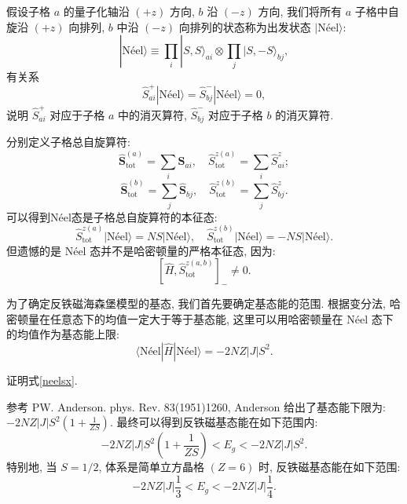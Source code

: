 假设子格 $a$ 的量子化轴沿 $(+z)$ 方向, $b$ 沿 $(-z)$ 方向, 我们将所有 $a$ 子格中自旋沿 $(+z)$ 向排列, $b$ 中沿 $(-z)$ 向排列的状态称为出发状态 $|\text{Néel}\rangle$:
\begin{equation}
|\text{Néel}\rangle\equiv\prod_{i}|S, S\rangle_{a i} \otimes \prod_{j}|S, -S\rangle_{b j} ,
\end{equation}
有关系
\begin{equation}
\hat{S}_{a i}^{+} |\text{Néel}\rangle=\hat{S}_{b j}^{-} |\text{Néel}\rangle=0,
\end{equation}
说明 $\hat{S}_{a i}^{+}$ 对应于子格 $a$ 中的消灭算符, $\hat{S}_{b j}^{-}$ 对应于子格 $b$ 的消灭算符.

分别定义子格总自旋算符:
\begin{equation}
\hat{\boldsymbol S}_{\mathrm{tot}}^{(a)}=\sum_{i} \hat{\boldsymbol S}_{a i}, \quad\hat{S}_{\mathrm{tot}}^{z(a)}=\sum_{i} \hat{S}_{a i}^{z} ;
\end{equation}
\begin{equation}
\hat{\boldsymbol S}_{\mathrm{tot}}^{(b)}=\sum_{j} \hat{\boldsymbol S}_{b j}, \quad\hat{S}_{\mathrm{tot}}^{z(b)}=\sum_{j} \hat{S}_{b j}^{z} .
\end{equation}
可以得到Néel态是子格总自旋算符的本征态:
\begin{equation}
\hat{S}_{\mathrm{tot}}^{z(a)}|\text{Néel}\rangle=N S|\text{Néel}\rangle, \quad\hat{S}_{\mathrm{tot}}^{z(b)}|\text{Néel}\rangle=-N S|\text{Néel}\rangle.
\end{equation}
但遗憾的是 Néel 态并不是哈密顿量的严格本征态, 因为:
\begin{equation}
\left[\hat{H},\hat{S}_{\mathrm{tot}}^{z(a, b)}\right] _-\neq 0 .
\end{equation}

为了确定反铁磁海森堡模型的基态, 我们首先要确定基态能的范围. 根据变分法, 哈密顿量在任意态下的均值一定大于等于基态能, 这里可以用哈密顿量在 Néel 态下的均值作为基态能上限:
\begin{equation}\label{neelsx}
\langle\text{Néel}|\hat{H}|\text{Néel}\rangle=-2 N Z|J| S^{2} .
\end{equation}
\begin{question}{}{}
    证明式\eqref{neelsx}.
\end{question}

参考 PW. Anderson. phys. Rev. 83(1951)1260, Anderson 给出了基态能下限为: $\displaystyle -2 N Z|J| S^{2}\left(1+\frac{1}{Z S}\right)$. 最终可以得到反铁磁基态能在如下范围内:
\begin{equation}
-2 N Z|J| S^{2}\left(1+\frac{1}{Z S}\right)<E_{g}<-2 N Z|J| S^{2}.
\end{equation}
特别地, 当 $S=1 / 2$, 体系是简单立方晶格 $(Z=6)$ 时, 反铁磁基态能在如下范围:
\begin{equation}
-2 N Z|J| \frac{1}{3}<E_{g}<-2 N Z|J| \frac{1}{4}.
\end{equation}

